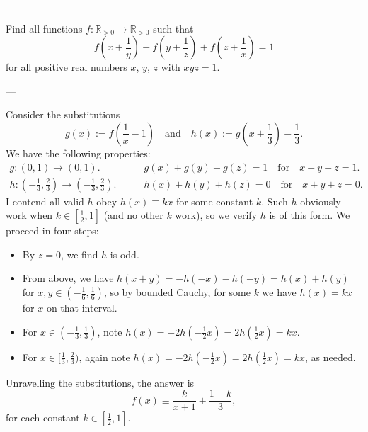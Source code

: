 
---

Find all functions $f:\mathbb R_{>0}\to\mathbb R_{>0}$ such that \[f\left(x+\frac1y\right)+f\left(y+\frac1z\right)+f\left(z+\frac1x\right)=1\]
for all positive real numbers $x$, $y$, $z$ with $xyz=1$.

---

Consider the substitutions \[g(x):=f\left(\frac1x-1\right)\quad\text{and}\quad h(x):=g\left(x+\frac13\right)-\frac13.\]
We have the following properties:
\begin{align*}
    g:(0,1)\to(0,1).&\qquad g(x)+g(y)+g(z)=1\quad\text{for}\quad x+y+z=1.\\
    h:(-\tfrac13,\tfrac23)\to(-\tfrac13,\tfrac23).&\qquad h(x)+h(y)+h(z)=0\quad\text{for}\quad x+y+z=0.
\end{align*}
I contend all valid $h$ obey $h(x)\equiv kx$ for some constant $k$. Such $h$ obviously work when $k\in[\tfrac12,1]$ (and no other $k$ work), so we verify $h$ is of this form. We proceed in four steps:
\begin{itemize}
    \item By $z=0$, we find $h$ is odd.
    \item From above, we have $h(x+y)=-h(-x)-h(-y)=h(x)+h(y)$ for $x,y\in(-\tfrac16,\tfrac16)$, so by bounded Cauchy, for some $k$ we have $h(x)=kx$ for $x$ on that interval.
    \item For $x\in(-\tfrac13,\tfrac13)$, note $h(x)=-2h(-\tfrac12x)=2h(\tfrac12x)=kx$.
    \item For $x\in[\tfrac13,\tfrac23)$, again note $h(x)=-2h(-\tfrac12x)=2h(\tfrac12x)=kx$, as needed.
\end{itemize}

Unravelling the substitutions, the answer is \[f(x)\equiv\frac k{x+1}+\frac{1-k}3,\]
for each constant $k\in[\tfrac12,1]$.

